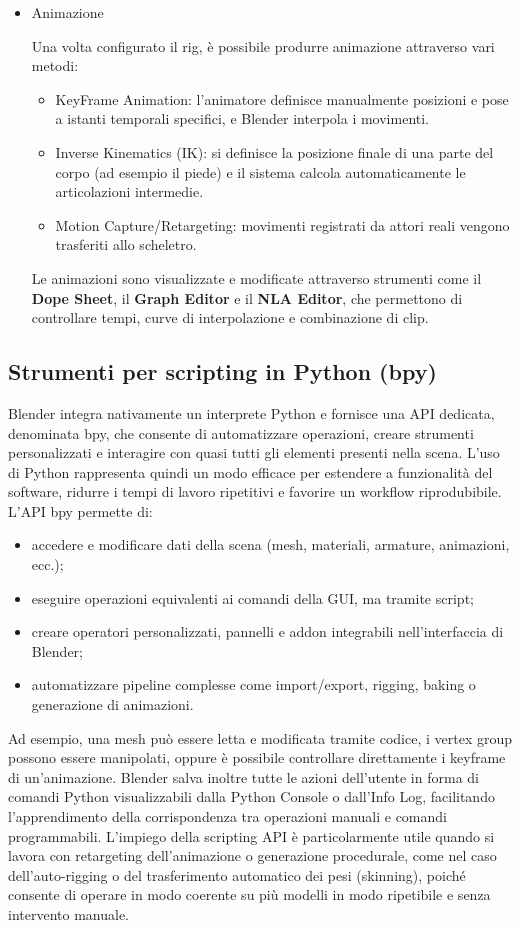 \begin{itemize}
        \item Animazione 

        Una volta configurato il rig, è possibile produrre animazione attraverso vari metodi: 
        \begin{itemize}
            \item  KeyFrame Animation: l'animatore definisce manualmente posizioni e pose a istanti temporali specifici, e Blender interpola i movimenti.
            \item Inverse Kinematics (IK): si definisce la posizione finale di una parte del corpo (ad esempio il piede) e il sistema calcola automaticamente le articolazioni intermedie.
            \item Motion Capture/Retargeting: movimenti registrati da attori reali vengono trasferiti allo scheletro.
        \end{itemize}
        Le animazioni sono visualizzate e modificate attraverso strumenti come il \textbf{Dope Sheet}, il \textbf{Graph Editor} e il \textbf{NLA Editor}, che permettono di controllare tempi, curve di interpolazione e combinazione di clip.
    \end{itemize}

\subsection{Strumenti per scripting in Python (bpy)}
Blender integra nativamente un interprete Python e fornisce una API dedicata, denominata bpy, che consente di automatizzare operazioni, creare strumenti personalizzati e interagire con quasi tutti gli elementi presenti nella scena. L'uso di Python rappresenta quindi un modo efficace per estendere a funzionalità del software, ridurre i tempi di lavoro ripetitivi e favorire un workflow riprodubibile.
L'API bpy permette di:
\begin{itemize}
    \item accedere e modificare dati della scena (mesh, materiali, armature, animazioni, ecc.);
    \item eseguire operazioni equivalenti ai comandi della GUI, ma tramite script;
    \item creare operatori personalizzati, pannelli e addon integrabili nell'interfaccia di Blender;
    \item automatizzare pipeline complesse come import/export, rigging, baking o generazione di animazioni.
\end{itemize}
Ad esempio, una mesh può essere letta e modificata tramite codice, i vertex group possono essere manipolati, oppure è possibile controllare direttamente i keyframe di un'animazione. Blender salva inoltre tutte le azioni dell'utente in forma di comandi Python visualizzabili dalla Python Console o dall'Info Log, facilitando l'apprendimento della corrispondenza tra operazioni manuali e comandi programmabili.
L'impiego della scripting API è particolarmente utile quando si lavora con retargeting dell'animazione o generazione procedurale, come nel caso dell'auto-rigging o del trasferimento automatico dei pesi (skinning), poiché consente di operare in modo coerente su più modelli in modo ripetibile e senza intervento manuale.



